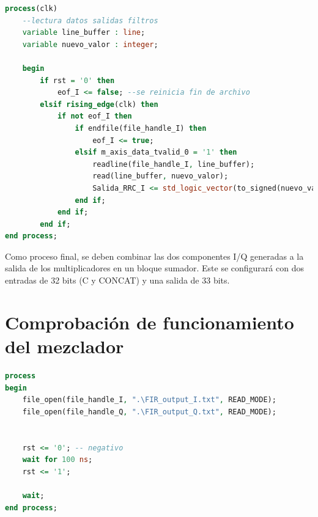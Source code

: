 \begin{lstlisting}[language=VHDL, style=mystyle, caption={Proceso de lectura del fichero de salida del filtrado (rama I)}]
process(clk) 
    --lectura datos salidas filtros
    variable line_buffer : line;
    variable nuevo_valor : integer;
        
    begin
        if rst = '0' then
            eof_I <= false; --se reinicia fin de archivo
        elsif rising_edge(clk) then 
            if not eof_I then
                if endfile(file_handle_I) then 
                    eof_I <= true; 
                elsif m_axis_data_tvalid_0 = '1' then
                    readline(file_handle_I, line_buffer);
                    read(line_buffer, nuevo_valor);
                    Salida_RRC_I <= std_logic_vector(to_signed(nuevo_valor, Salida_RRC_I'length));
                end if;
            end if;
        end if;    
end process;  
\end{lstlisting}

\vspace{3mm}

Como proceso final, se deben combinar las dos componentes I/Q generadas a la salida de los multiplicadores en un bloque sumador. Este se configurará con dos entradas de 32 bits (C y CONCAT) y una salida de 33 bits.


\section{Comprobación de funcionamiento del mezclador}

\begin{lstlisting}[language=VHDL, style=mystyle, caption={Proceso de estimulación}]
process
begin
    file_open(file_handle_I, ".\FIR_output_I.txt", READ_MODE);
    file_open(file_handle_Q, ".\FIR_output_Q.txt", READ_MODE);
  
  
    rst <= '0'; -- negativo
    wait for 100 ns;
    rst <= '1';               

    wait;
end process;
\end{lstlisting}








